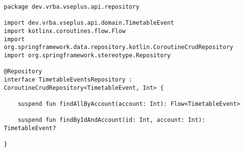 \begin{lstlisting}[label={code:timetable-events-repository}, caption={Definice repozitáře pro doménovou třídu \code{TimetableEvent}}]
package dev.vrba.vseplus.api.repository

import dev.vrba.vseplus.api.domain.TimetableEvent
import kotlinx.coroutines.flow.Flow
import org.springframework.data.repository.kotlin.CoroutineCrudRepository
import org.springframework.stereotype.Repository

@Repository
interface TimetableEventsRepository : CoroutineCrudRepository<TimetableEvent, Int> {

    suspend fun findAllByAccount(account: Int): Flow<TimetableEvent>

    suspend fun findByIdAndAccount(id: Int, account: Int): TimetableEvent?

}
\end{lstlisting}

